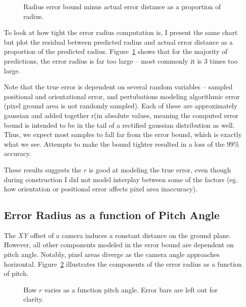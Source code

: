 \documentclass[a4paper,12pt,twoside,openright]{report}
\begin{document}
\begin{figure}[htb]
    \begin{center}
        
    \end{center}
    \caption[Bound Minus True Distance as a Proportion]{Radius error bound minus actual error distance as a proportion of radius.}
    \label{fig:camera:proportional diff}
\end{figure}

To look at how tight the error radius computation is, I present the same chart
but plot the residual between predicted radius and actual error distance as a 
proportion of the predicted radius. Figure~\ref{fig:camera:proportional diff} shows that for the majority
of predictions, the error radius is far too large -- most commonly it is 3 times 
too large. 

Note that the true error is dependent on several random variables -- sampled positional and orientational
error, and pertubations modeling algorithmic error (pixel ground area is not randomly sampled). Each
of these are approximately gaussian and added together r(in absolute values, meaning the computed error bound is intended to be in the tail
of a rectified gaussian distribution as well. Thus, we expect most samples to
fall far from the error bound, which is exactly what we see.
Attempts to make the bound tighter resulted in a loss of the 99\% accuracy.

These results suggests the $r$ is good at modeling the true error, even though during construction
I did not model interplay between some of the factors (eg. how orientation 
or positional error affects pixel area inaccuracy).

\subsection{Error Radius as a function of Pitch Angle}

The \textit{XY} offset of a camera induces a constant distance on the ground plane. However,
all other components modeled in the error bound are dependent on pitch angle. Notably,
pixel areas diverge as the camera angle approaches horizontal. Figure~\ref{fig:camera:radius versus pitch}
illustrates the components of the error radius as a function of pitch.

\begin{figure}[htb]
    \begin{center}
        
    \end{center}
    \caption[$r$ as a Function of Pitch Angle]{How $r$ varies as a function pitch angle. Error bars are left out for clarity.}
    \label{fig:camera:radius versus pitch}
\end{figure}
\end{document}
